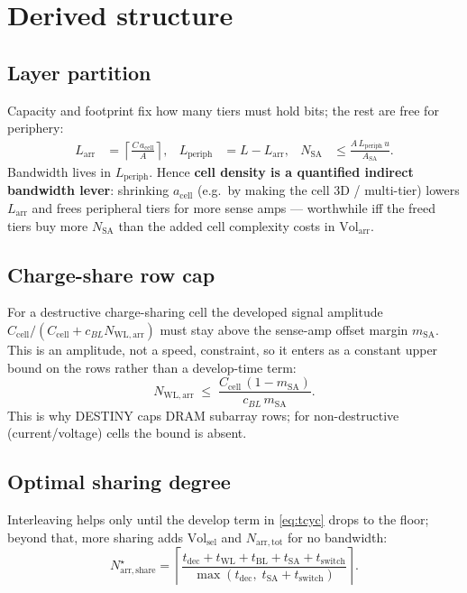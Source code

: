 \documentclass[11pt]{article}
\newcommand{\Nshare}{N_{\mathrm{arr,share}}}
\newcommand{\Ntot}{N_{\mathrm{arr,tot}}}
\newcommand{\Nsa}{N_{\mathrm{SA}}}
\newcommand{\Nwl}{N_{\mathrm{WL,arr}}}
\newcommand{\tdec}{t_{\mathrm{dec}}}
\newcommand{\twl}{t_{\mathrm{WL}}}
\newcommand{\tbl}{t_{\mathrm{BL}}}
\newcommand{\tsa}{t_{\mathrm{SA}}}
\newcommand{\tsw}{t_{\mathrm{switch}}}
\newcommand{\Volarr}{\mathrm{Vol}_{\mathrm{arr}}}
\newcommand{\Volsel}{\mathrm{Vol}_{\mathrm{sel}}}
\newcommand{\Larr}{L_{\mathrm{arr}}}
\newcommand{\Lper}{L_{\mathrm{periph}}}
\newcommand{\Asa}{A_{\mathrm{SA}}}
\newcommand{\acell}{a_{\mathrm{cell}}}
\begin{document}
\section{Derived structure}
\label{sec:derived}

\subsection{Layer partition}
Capacity and footprint fix how many tiers must hold bits; the rest are free for
periphery:
\begin{align}
  \Larr  &= \left\lceil \frac{C\,\acell}{A} \right\rceil, &
  \Lper  &= L - \Larr, &
  \Nsa   &\le \frac{A\,\Lper\,u}{\Asa}.
  \label{eq:layers}
\end{align}
Bandwidth lives in $\Lper$. Hence \textbf{cell density is a quantified indirect
bandwidth lever}: shrinking $\acell$ (e.g.\ by making the cell 3D / multi-tier)
lowers $\Larr$ and frees peripheral tiers for more sense amps --- worthwhile iff
the freed tiers buy more $\Nsa$ than the added cell complexity costs in $\Volarr$.

\subsection{Charge-share row cap}
For a destructive charge-sharing cell the developed signal amplitude
$C_{\mathrm{cell}}/(C_{\mathrm{cell}}+c_{BL}\Nwl)$ must stay above the sense-amp
offset margin $m_{\mathrm{SA}}$. This is an amplitude, not a speed, constraint,
so it enters as a constant upper bound on the rows rather than a develop-time
term:
\begin{equation}
  \Nwl \;\le\; \frac{C_{\mathrm{cell}}\,(1-m_{\mathrm{SA}})}{c_{BL}\,m_{\mathrm{SA}}}.
  \label{eq:rowcap}
\end{equation}
This is why DESTINY caps DRAM subarray rows; for non-destructive
(current/voltage) cells the bound is absent.

\subsection{Optimal sharing degree}
Interleaving helps only until the develop term in \eqref{eq:tcyc} drops to the
floor; beyond that, more sharing adds $\Volsel$ and $\Ntot$ for no bandwidth:
\begin{equation}
  \Nshare^\star =
  \left\lceil
    \frac{\tdec+\twl+\tbl+\tsa+\tsw}{\max(\tdec,\;\tsa+\tsw)}
  \right\rceil .
  \label{eq:nshare}
\end{equation}
\end{document}
